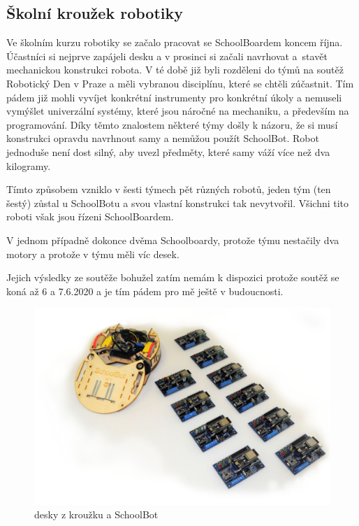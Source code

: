 \documentclass{template/socthesis}
\begin{document}
\subsection{Školní kroužek robotiky}

Ve školním kurzu robotiky se začalo pracovat se SchoolBoardem koncem října. Účastníci si nejprve zapájeli %
desku a v prosinci si začali navrhovat a~stavět mechanickou konstrukci robota. V té době již byli rozděleni do týmů na soutěž Robotický Den \cite{RD2020}
 v Praze a měli vybranou disciplínu, které se chtěli zúčastnit. Tím pádem již mohli vyvíjet konkrétní instrumenty pro konkrétní úkoly a nemuseli vymýšlet univerzální systémy, které jsou náročné na mechaniku, a především na programování. Díky těmto znalostem některé týmy došly k názoru, že si musí konstrukci opravdu navrhnout samy a nemůžou použít SchoolBot. Robot jednoduše není dost silný, aby uvezl předměty, které samy váží více než dva kilogramy.

Tímto způsobem vzniklo v šesti týmech pět různých robotů, jeden tým (ten šestý) zůstal u SchoolBotu a svou vlastní konstrukci tak nevytvořil. Všichni tito roboti však jsou řízeni SchoolBoardem. 

V jednom případně dokonce dvěma Schoolboardy, protože týmu nestačily dva motory a protože v týmu měli víc desek.

Jejich výsledky ze soutěže bohužel zatím nemám k dispozici protože soutěž se koná až 6 a 7.6.2020 a je tím pádem pro mě ještě v budoucnosti.

\begin{figure}[h]
	\centering
	\includegraphics[width=1.1\textwidth]{img/sada2.JPG}
	\caption{desky z kroužku a SchoolBot}
\end{figure}
\end{document}
